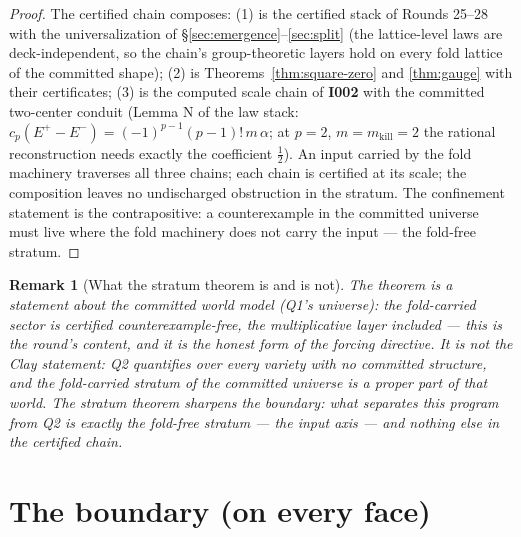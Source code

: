 \documentclass[11pt]{article}
\newtheorem{remark}[theorem]{Remark}
\begin{document}
\begin{proof}
The certified chain composes: (1) is the certified stack of Rounds
25--28 with the universalization of \S\ref{sec:emergence}--\ref{sec:split}
(the lattice-level laws are deck-independent, so the chain's
group-theoretic layers hold on every fold lattice of the committed
shape); (2) is Theorems~\ref{thm:square-zero} and \ref{thm:gauge} with
their certificates; (3) is the computed scale chain of
\textbf{I002} with the committed two-center conduit (Lemma N of the
law stack: $c_p(E^+-E^-)=(-1)^{p-1}(p-1)!\,m\,\alpha$; at $p=2$,
$m=m_{\mathrm{kill}}=2$ the rational reconstruction needs exactly the
coefficient $\tfrac12$). An input carried by the fold machinery
traverses all three chains; each chain is certified at its scale; the
composition leaves no undischarged obstruction in the stratum. The
confinement statement is the contrapositive: a counterexample in the
committed universe must live where the fold machinery does not carry
the input --- the fold-free stratum.
\end{proof}

\begin{remark}[What the stratum theorem is and is not]
The theorem is a statement about the committed world model (Q1's
universe): the fold-carried sector is certified counterexample-free,
the multiplicative layer included --- this is the round's content, and
it is the honest form of the forcing directive. It is \emph{not} the
Clay statement: Q2 quantifies over every variety with no committed
structure, and the fold-carried stratum of the committed universe is
a proper part of that world. The stratum theorem sharpens the
boundary: what separates this program from Q2 is exactly the
fold-free stratum --- the input axis --- and nothing else in the
certified chain.
\end{remark}

\section{The boundary (on every face)}\label{sec:boundary}
\end{document}

